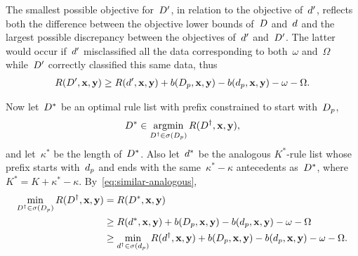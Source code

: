%
The smallest possible objective for~${D}'$, in relation
to the objective of~${d}'$, reflects both the difference
between the objective lower bounds of~${D}$ and~${d}$
and the largest possible discrepancy between the
objectives of~${d}'$ and~${D}'$.
%
The latter would occur if~${d}'$ misclassified all the data
corresponding to both~$\omega$ and~$\Omega$ while~${D}'$
correctly classified this same data, thus
\begin{align}
R({D}', \mathbf{x}, \mathbf{y}) \ge R({d}', \mathbf{x}, \mathbf{y})
  + b(D_p, \mathbf{x}, \mathbf{y}) - b(d_p, \mathbf{x}, \mathbf{y}) - \omega - \Omega.
\label{eq:similar-analogous}
\end{align}
%

Now let~${D}^*$ be an optimal rule list with prefix
constrained to start with~$D_p$,
\begin{align}
{D}^* \in \operatorname*{argmin}_{{D}^\dagger \in \sigma(D_p)} R({D}^\dagger, \mathbf{x}, \mathbf{y}),
\end{align}
and let~$\kappa^*$ be the length of~${D}^*$.
%
Also let~${d}^*$ be the analogous $K^*$-rule list whose prefix
starts with~$d_p$ and ends with the same~${\kappa^* - \kappa}$
antecedents as~${D}^*$, where~${K^* = K + \kappa^* - \kappa}$.
%
By~\eqref{eq:similar-analogous},
\begin{align}
\min_{{D}^\dagger \in \sigma(D_p)} R({D}^\dagger, \mathbf{x}, \mathbf{y})
&= R({D}^*, \mathbf{x}, \mathbf{y}) \nonumber \\
&\ge R({d}^*, \mathbf{x}, \mathbf{y})
  + b(D_p, \mathbf{x}, \mathbf{y}) - b(d_p, \mathbf{x}, \mathbf{y}) - \omega - \Omega \nonumber \\
&\ge \min_{{d}^\dagger \in \sigma(d_p)} R({d}^\dagger, \mathbf{x}, \mathbf{y})
  + b(D_p, \mathbf{x}, \mathbf{y}) - b(d_p, \mathbf{x}, \mathbf{y}) - \omega - \Omega.
\end{align}
